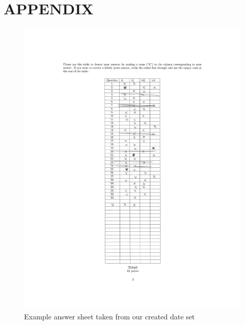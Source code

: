 \documentclass[a4paper,twoside]{article}
\begin{document}
\vfill

{\small
}

\newpage
\onecolumn
\section*{\uppercase{Appendix}}
\label{appdendix}
\begin{figure}[!h]
  \centering
  \includegraphics[width=\columnwidth]{Latex/imgs/example_answer_sheet.pdf}
  \caption{Example answer sheet taken from our created date set}
  \label{fig:example_answer_sheet}
 \end{figure}
 
\end{document}
